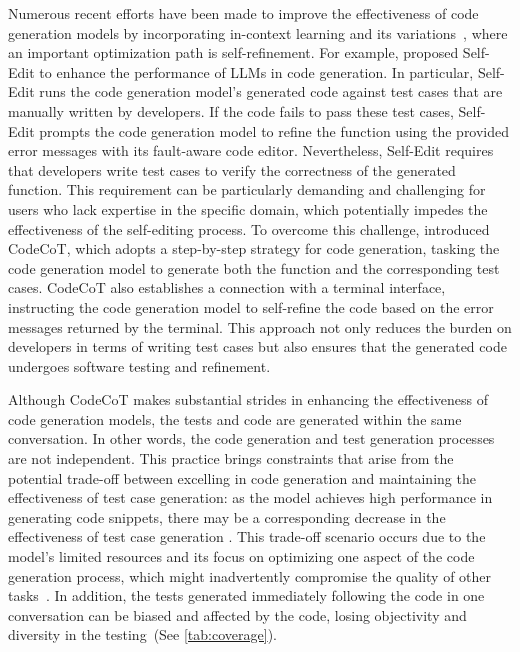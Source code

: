 \documentclass[manuscript,screen,review]{acmart}
\begin{document}
Numerous recent efforts have been made to improve the effectiveness of code generation models by incorporating in-context learning and its variations~\cite{Dong2023SelfcollaborationCG,Wei2022ChainOT,Le2023CodeChainTM,Huang2023CodeCoTAB,Zhang2023SelfEditFC,Chen2023TeachingLL,Madaan2023SelfRefineIR}, where an important optimization path is self-refinement. For example, \citeauthor{Zhang2023SelfEditFC} proposed Self-Edit to enhance the performance of LLMs in code generation. In particular, Self-Edit runs the code generation model's generated code against test cases that are manually written by developers. If the code fails to pass these test cases, Self-Edit prompts the code generation model to refine the function using the provided error messages with its fault-aware code editor. Nevertheless, Self-Edit requires that developers write test cases to verify the correctness of the generated function. This requirement can be particularly demanding and challenging for users who lack expertise in the specific domain, which potentially impedes the effectiveness of the self-editing process. To overcome this challenge, \citeauthor{Huang2023CodeCoTAB} introduced CodeCoT, which adopts a step-by-step strategy for code generation, tasking the code generation model to generate both the function and the corresponding test cases. 
CodeCoT also establishes a connection with a terminal interface, instructing the code generation model to self-refine the code based on the error messages returned by the terminal. This approach not only reduces the burden on developers in terms of writing test cases but also ensures that the generated code undergoes software testing and refinement. 


Although CodeCoT makes substantial strides in enhancing the effectiveness of code generation models, the tests and code are generated within the same conversation. In other words,
the code generation and test generation processes are not independent. This practice brings constraints that arise from the potential trade-off between excelling in code generation and maintaining the effectiveness of test case generation: as the model achieves high performance in generating code snippets, there may be a corresponding decrease in the effectiveness of test case generation \cite{Chen2023AgentVerseFM,Zhang2023ProAgentBP}. This trade-off scenario occurs due to the model's limited resources and its focus on optimizing one aspect of the code generation process, which might inadvertently compromise the quality of other tasks~\cite{Chen2023AgentVerseFM,Zhang2023ProAgentBP}. In addition, the tests generated immediately following the code in one conversation can be biased and affected by the code, losing objectivity and diversity in the testing~(See \cref{tab:coverage}).
\end{document}
